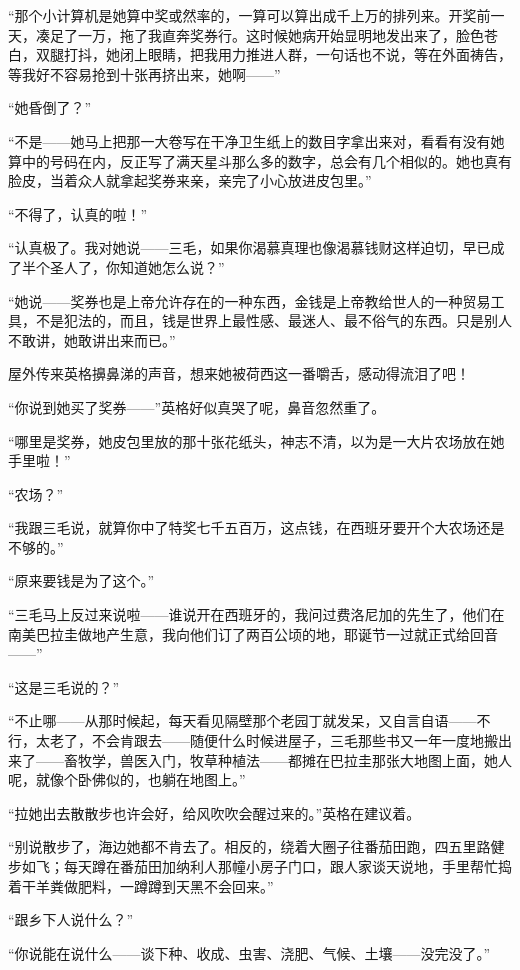 \par “那个小计算机是她算中奖或然率的，一算可以算出成千上万的排列来。开奖前一天，凑足了一万，拖了我直奔奖券行。这时候她病开始显明地发出来了，脸色苍白，双腿打抖，她闭上眼睛，把我用力推进人群，一句话也不说，等在外面祷告，等我好不容易抢到十张再挤出来，她啊——”
\par “她昏倒了？”
\par “不是——她马上把那一大卷写在干净卫生纸上的数目字拿出来对，看看有没有她算中的号码在内，反正写了满天星斗那么多的数字，总会有几个相似的。她也真有脸皮，当着众人就拿起奖券来亲，亲完了小心放进皮包里。”
\par “不得了，认真的啦！”
\par “认真极了。我对她说——三毛，如果你渴慕真理也像渴慕钱财这样迫切，早已成了半个圣人了，你知道她怎么说？”
\par “她说——奖券也是上帝允许存在的一种东西，金钱是上帝教给世人的一种贸易工具，不是犯法的，而且，钱是世界上最性感、最迷人、最不俗气的东西。只是别人不敢讲，她敢讲出来而已。”
\par 屋外传来英格擤鼻涕的声音，想来她被荷西这一番嚼舌，感动得流泪了吧！
\par “你说到她买了奖券——”英格好似真哭了呢，鼻音忽然重了。
\par “哪里是奖券，她皮包里放的那十张花纸头，神志不清，以为是一大片农场放在她手里啦！”
\par “农场？”
\par “我跟三毛说，就算你中了特奖七千五百万，这点钱，在西班牙要开个大农场还是不够的。”
\par “原来要钱是为了这个。”
\par “三毛马上反过来说啦——谁说开在西班牙的，我问过费洛尼加的先生了，他们在南美巴拉圭做地产生意，我向他们订了两百公顷的地，耶诞节一过就正式给回音——”
\par “这是三毛说的？”
\par “不止哪——从那时候起，每天看见隔壁那个老园丁就发呆，又自言自语——不行，太老了，不会肯跟去——随便什么时候进屋子，三毛那些书又一年一度地搬出来了——畜牧学，兽医入门，牧草种植法——都摊在巴拉圭那张大地图上面，她人呢，就像个卧佛似的，也躺在地图上。”
\par “拉她出去散散步也许会好，给风吹吹会醒过来的。”英格在建议着。
\par “别说散步了，海边她都不肯去了。相反的，绕着大圈子往番茄田跑，四五里路健步如飞；每天蹲在番茄田加纳利人那幢小房子门口，跟人家谈天说地，手里帮忙捣着干羊粪做肥料，一蹲蹲到天黑不会回来。”
\par “跟乡下人说什么？”
\par “你说能在说什么——谈下种、收成、虫害、浇肥、气候、土壤——没完没了。”
